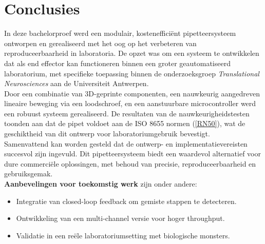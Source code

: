 \chapter{Conclusies}
In deze bachelorproef werd een modulair, kostenefficiënt pipetteersysteem ontworpen en gerealiseerd met het oog op het verbeteren van reproduceerbaarheid in laboratoria. De opzet was om een systeem te ontwikkelen dat als end effector kan functioneren binnen een groter geautomatiseerd laboratorium, met specifieke toepassing binnen de onderzoeksgroep \textit{Translational Neurosciences} aan de Universiteit Antwerpen.
\\[12pt]Door een combinatie van 3D-geprinte componenten, een nauwkeurig aangedreven lineaire beweging via een loodschroef, en een aanstuurbare microcontroller werd een robuust systeem gerealiseerd. De resultaten van de nauwkeurigheidstesten toonden aan dat de pipet voldoet aan de ISO 8655 normen (\ref{RN50}), wat de geschiktheid van dit ontwerp voor laboratoriumgebruik bevestigt.
\\[12pt]Samenvattend kan worden gesteld dat de ontwerp- en implementatievereisten succesvol zijn ingevuld. Dit pipetteersysteem biedt een waardevol alternatief voor dure commerciële oplossingen, met behoud van precisie, reproduceerbaarheid en gebruiksgemak.
\\[12pt]\textbf{Aanbevelingen voor toekomstig werk} zijn onder andere:
\begin{itemize}
  \item Integratie van closed-loop feedback om gemiste stappen te detecteren.
  \item Ontwikkeling van een multi-channel versie voor hoger throughput.
  \item Validatie in een reële laboratoriumsetting met biologische monsters.
\end{itemize}